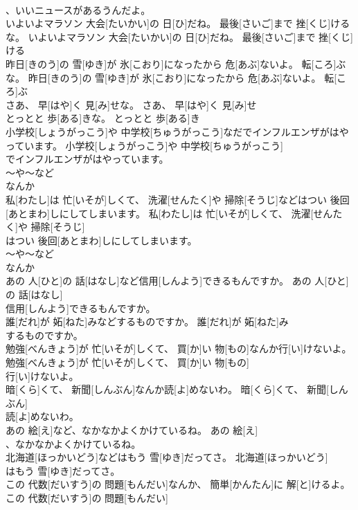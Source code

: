 \documentclass[8pt]{extreport}
\begin{document}
\begin{CJK}{UTF8}{min}
\\	、いいニュースがあるうんだよ。	
\\	いよいよマラソン 大会[たいかい]の 日[ひ]だね。 最後[さいご]まで 挫[くじ]けるな。	いよいよマラソン 大会[たいかい]の 日[ひ]だね。 最後[さいご]まで 挫[くじ]ける
\\	昨日[きのう]の 雪[ゆき]が 氷[こおり]になったから 危[あぶ]ないよ。 転[ころ]ぶな。	昨日[きのう]の 雪[ゆき]が 氷[こおり]になったから 危[あぶ]ないよ。 転[ころ]ぶ
\\	さあ、 早[はや]く 見[み]せな。	さあ、 早[はや]く 見[み]せ
\\	とっとと 歩[ある]きな。	とっとと 歩[ある]き
\\	小学校[しょうがっこう]や 中学校[ちゅうがっこう]なだでインフルエンザがはやっています。	小学校[しょうがっこう]や 中学校[ちゅうがっこう]
\\	でインフルエンザがはやっています。	
\\	～や～など 
\\	なんか
\\	私[わたし]は 忙[いそが]しくて、 洗濯[せんたく]や 掃除[そうじ]などはつい 後回[あとまわ]しにしてしまいます。	私[わたし]は 忙[いそが]しくて、 洗濯[せんたく]や 掃除[そうじ]
\\	はつい 後回[あとまわ]しにしてしまいます。	
\\	～や～など 
\\	なんか
\\	あの 人[ひと]の 話[はなし]など信用[しんよう]できるもんですか。	あの 人[ひと]の 話[はなし]
\\	信用[しんよう]できるもんですか。	
\\	誰[だれ]が 妬[ねた]みなどするものですか。	誰[だれ]が 妬[ねた]み
\\	するものですか。	
\\	勉強[べんきょう]が 忙[いそが]しくて、 買[か]い 物[もの]なんか行[い]けないよ。	勉強[べんきょう]が 忙[いそが]しくて、 買[か]い 物[もの]
\\	行[い]けないよ。	
\\	暗[くら]くて、 新聞[しんぶん]なんか読[よ]めないわ。	暗[くら]くて、 新聞[しんぶん]
\\	読[よ]めないわ。	
\\	あの 絵[え]など、なかなかよくかけているね。	あの 絵[え]
\\	、なかなかよくかけているね。	
\\	北海道[ほっかいどう]などはもう 雪[ゆき]だってさ。	北海道[ほっかいどう]
\\	はもう 雪[ゆき]だってさ。	
\\	この 代数[だいすう]の 問題[もんだい]なんか、 簡単[かんたん]に 解[と]けるよ。	この 代数[だいすう]の 問題[もんだい]

\end{CJK}
\end{document}
